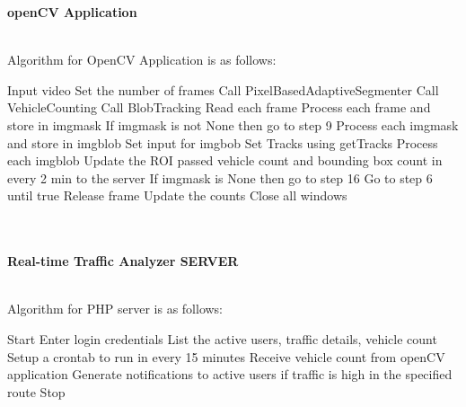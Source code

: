 \newpage
\textbf{openCV Application}
\\
\\
\begin{algorithm}
\begin{algorithmic}[1]
\caption{Algorithm for OpenCV Application is as follows:}

\State Input video
\State Set the number of frames
\State Call PixelBasedAdaptiveSegmenter
\State Call VehicleCounting 
\State Call BlobTracking  
\State Read each frame
\State Process each frame and store in imgmask
\State If imgmask is not None then go to step 9
\State Process each imgmask and store in imgblob
\State Set input for imgbob
\State Set Tracks using getTracks
\State Process each imgblob
\State Update the ROI passed vehicle count and bounding box count in every 2 min to the server
\State If imgmask is None then go to step 16
\State Go to step 6 until true
\State Release frame
\State Update the counts
\State Close all windows

\end{algorithmic}
\end{algorithm}
\\
\\
\textbf{Real-time Traffic Analyzer SERVER}
\\
\\
\begin{algorithm}
\begin{algorithmic}[1]
\caption{Algorithm for PHP server is as follows:}

\State Start
\State Enter login credentials
\State List the active users, traffic details, vehicle count
\State Setup a crontab to run in every 15 minutes
\State Receive vehicle count from openCV application
\State Generate notifications to active users if traffic is high in the specified route 
\State Stop


\end{algorithmic}
\end{algorithm}